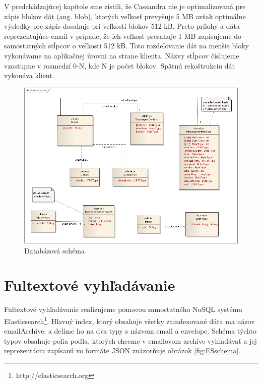 \documentclass[11pt,twoside,a4paper]{book}
\begin{document}

V predchádzajúcej kapitole sme zistili, že Cassandra nie je optimalizovaná pre zápis blokov dát (ang. blob), ktorých veľkosť prevyšuje 5 MB avšak optimálne výsledky pre zápis dosahuje pri veľkosti blokov 512 kB. Preto prílohy a dáta reprezentujúce email v prípade, že ich veľkosť presahuje 1 MB zapisujeme do samostatných stĺpcov o veľkosti 512 kB. Toto rozdeľovanie dát na menšie bloky vykonávame na aplikačnej úrovni na strane klienta. Názvy stĺpcov číslujeme vzostupne v rozmedzí 0-N, kde N je počet blokov. Spätnú rekoštrukciu dát vykonáva klient.

\begin{figure}[h]
 \centering
 \includegraphics[width=17cm]{./figures/cassandra.png}
 \caption{Databázová schéma}
 \label{fig:Cschema}
\end{figure}

\section{Fultextové vyhľadávanie}

Fultextové vyhľadávanie realizujeme pomocou samostatného NoSQL systému Elasticsearch\footnote{http://elasticsearch.org}. Hlavný index, ktorý obsahuje všetky zaindexované dáta ma názov emailArchive, a delíme ho na dva typy s názvom email a envelope. Schéma týchto typov obsahuje polia poďla, ktorých chceme v emailovom archíve vyhľadávať a jej reprezentáciu zapísanú vo formáte JSON znázorňuje obrázok \ref{fig:ESschema}.
\end{document}
